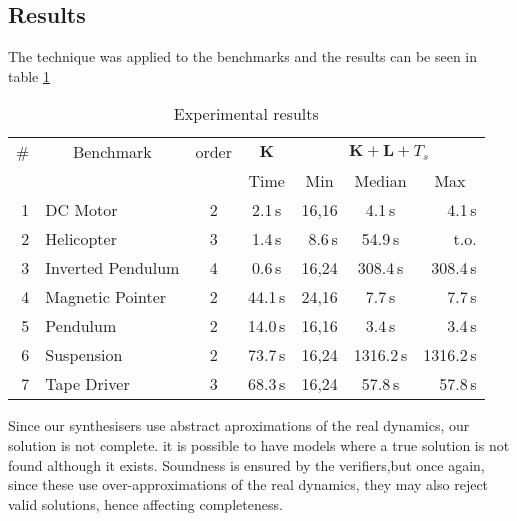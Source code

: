 \documentclass[sigconf]{llncs}
\newcommand{\mat}[1]{\boldsymbol{#1}}
\begin{document}
\subsection{Results}
\label{exp:results}
The technique was applied  to the benchmarks and the results can be seen in table \ref{tab:results}
\begin{table}
\centering
%
\begin{tabular}{| r | l | c | c | r | c | r |}
%
\hline
\# & \multicolumn{1}{|c|}{Benchmark} & \multicolumn{1}{|c|}{order}  & \multicolumn{1}{|c|}{$\mat{K}$} & \multicolumn{3}{|c|}{$\mat{K}+\mat{L}+T_s$} \\
   &                                  & & \multicolumn{1}{|c|}{Time} & \multicolumn{1}{|c|}{Min} & \multicolumn{1}{|c|}{Median} & \multicolumn{1}{|c|}{Max}\\\hline
1  & DC Motor          & 2 & 2.1\,s& 16,16  &   4.1\,s &   4.1\,s\\
2  & Helicopter        & 3  & 1.4\,s& 8.6\,s  &   54.9\,s &   t.o.\\
3  & Inverted Pendulum & 4 &   0.6\,s& 16,24  &  308.4\,s &  308.4\,s\\
4  & Magnetic Pointer  & 2  & 44.1\,s& 24,16  &  7.7\,s &  7.7\,s \\
5  & Pendulum          & 2 & 14.0\,s& 16,16  &   3.4\,s &   3.4\,s\\
6  & Suspension        & 2 & 73.7\,s& 16,24  &   1316.2\,s &   1316.2\,s\\
7  & Tape Driver       & 3 & 68.3\,s& 16,24  &   57.8\,s &   57.8\,s\\
\hline
%
\end{tabular}
\vspace{0.05in}
\caption{Experimental results\label{tab:results}}
\end{table}

Since our synthesisers use abstract aproximations of the real dynamics, our solution is not complete.
it is possible to have models where a true solution is not found although it exists.
Soundness is ensured by the verifiers,but once again, since these use over-approximations of the real dynamics, they may also reject valid solutions, hence affecting completeness. 
\end{document}
